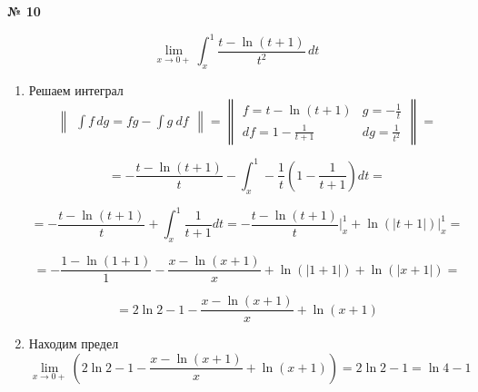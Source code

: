 \documentclass{article}
\begin{document}
\textbf{№ 10} 

\begingroup

\Large

$$ \lim\limits_{x \to 0+} \int_{x}^{1} \frac{t-\ln(t+1)}{t^2} \,dt $$

\begin{enumerate}
\item Решаем интеграл
\\
$$ \begin{Vmatrix} \int f \,dg = fg - \int g \ df \end{Vmatrix} =
   \begin{Vmatrix} f = t - \ln(t+1)      & g = -\frac{1}{t} \\
                  df = 1 - \frac{1}{t+1} & dg = \frac{1}{t^2}  \end{Vmatrix} =$$

$$ = -\frac{t - \ln(t+1)}{t} - \int_{x}^{1} -\frac{1}{t} \left( 1 - \frac{1}{t+1} \right) dt = $$

$$ = -\frac{t - \ln(t+1)}{t} + \int_{x}^{1} \frac{1}{t+1} dt 
= -\frac{t - \ln(t+1)}{t} \bigg\rvert_{x}^{1} +\ln(\left|t+1\right|) \bigg\rvert_{x}^{1} = $$

$$ = -\frac{1 - \ln(1+1)}{1} -\frac{x - \ln(x+1)}{x} +\ln(\left|1+1\right|) +\ln(\left|x+1\right|)
= $$

$$ = 2\ln{2} - 1 -\frac{x - \ln(x+1)}{x} + \ln(x+1) $$

\item Находим предел
$$ \lim\limits_{x \to 0+} \left( 2\ln{2} - 1 -\frac{x - \ln(x+1)}{x} + \ln(x+1) \right)
= 2\ln{2} - 1 = \ln{4} - 1 $$

\end{enumerate}
\endgroup
\end{document}
